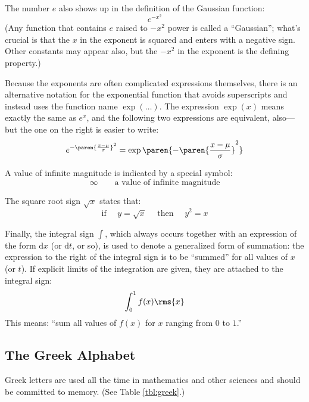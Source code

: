 The number $e$ also shows up in the definition of the Gaussian 
function:
%
\[
e^{-x^2}
\]
%
(Any function that contains $e$ raised to $- x^2$ power is called a
``Gaussian'';  what's crucial is that the $x$ in the exponent is
squared and enters with a negative sign. Other constants may appear
also, but the $-x^2$ in the exponent is the defining property.)

Because the exponents are often complicated expressions themselves,
there is an alternative notation for the exponential function that
avoids superscripts and instead uses the function name $\exp(\dots)$.
The expression $\exp(x)$ means exactly the same as $e^x$, and the
following two expressions are equivalent, also---but the one on the
right is easier to write:
%
\[
e^{-\paren{ \frac{x-\mu}{\sigma} }^2 } 
= \exp \paren{-\paren{ \frac{x-\mu}{\sigma} }^2 } 
\]

A value of infinite magnitude is indicated by a special symbol:
%
\[
\infty \qquad \text{a value of infinite magnitude}
\]

The square root sign $\sqrt{x}$ states that:
%
\[
\text{if $\quad y = \sqrt{x} \quad $ then $\quad y^2 = x$}
\]

Finally, the integral sign $\int$, which always occurs together with
an expression of the form $\text{d}x$ (or $\text{d}t$, or so), is used
to denote a generalized form of summation: the expression to the right
of the integral sign is to be ``summed'' for all values of $x$ (or
$t$). If explicit limits of the integration are given, they are
attached to the integral sign:
%
\[
\int_0^1 f(x) \rms{x}
\]
%
This means: ``sum all values of $f(x)$ for $x$ ranging from $0$ to
$1$.''


\subsection{The Greek Alphabet}


Greek letters are used all the time in mathematics and other sciences
and should be committed to memory. (See Table \ref{tbl:greek}.)

